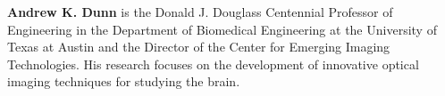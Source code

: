 \documentclass[12pt]{spieman}
\begin{document}
\begin{spacing}{2}
\vspace{2ex}\noindent\textbf{Andrew K. Dunn} is the Donald J. Douglass Centennial Professor of Engineering in the Department of Biomedical Engineering at the University of Texas at Austin and the Director of the Center for Emerging Imaging Technologies. His research focuses on the development of innovative optical imaging techniques for studying the brain.


\listoffigures

\end{spacing}
\end{document}
